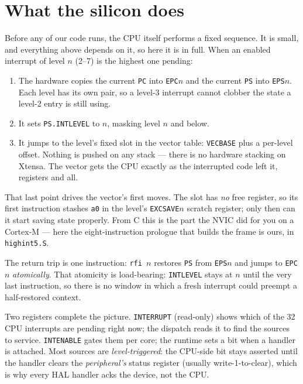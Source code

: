 \section{What the silicon does}

Before any of our code runs, the CPU itself performs a fixed sequence. It is
small, and everything above depends on it, so here it is in full. When an
enabled interrupt of level $n$ (2--7) is the highest one pending:

\begin{enumerate}
  \item The hardware copies the current \texttt{PC} into \texttt{EPC$n$} and
        the current \texttt{PS} into \texttt{EPS$n$}. Each level has its own
        pair, so a level-3 interrupt cannot clobber the state a level-2 entry
        is still using.
  \item It sets \texttt{PS.INTLEVEL} to $n$, masking level $n$ and below.
  \item It jumps to the level's fixed slot in the vector table:
        \texttt{VECBASE} plus a per-level offset. Nothing is pushed on any
        stack --- there is no hardware stacking on Xtensa. The vector gets the
        CPU exactly as the interrupted code left it, registers and all.
\end{enumerate}

That last point drives the vector's first moves. The slot has \emph{no} free
register, so its first instruction stashes \texttt{a0} in the level's
\texttt{EXCSAVE$n$} scratch register; only then can it start saving state
properly. From C this is the part the NVIC did for you on a Cortex-M ---
here the eight-instruction prologue that builds the frame is ours, in
\texttt{highint5.S}.

The return trip is one instruction: \texttt{rfi $n$} restores
\texttt{PS} from \texttt{EPS$n$} and jumps to \texttt{EPC$n$}
\emph{atomically}. That atomicity is load-bearing: \texttt{INTLEVEL} stays
at $n$ until the very last instruction, so there is no window in which a
fresh interrupt could preempt a half-restored context.

Two registers complete the picture. \texttt{INTERRUPT} (read-only) shows
which of the 32 CPU interrupts are pending right now; the dispatch reads it
to find the sources to service. \texttt{INTENABLE} gates them per core; the
runtime sets a bit when a handler is attached. Most sources are
\emph{level-triggered}: the CPU-side bit stays asserted until the handler
clears the \emph{peripheral's} status register (usually write-1-to-clear),
which is why every HAL handler acks the device, not the CPU.

